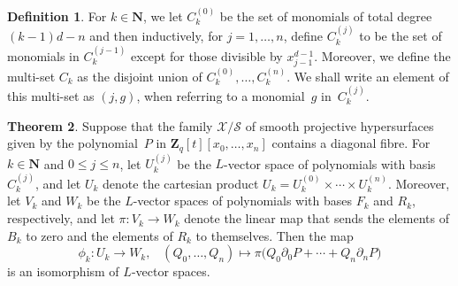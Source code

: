 \documentclass[a4paper,11pt]{article}
\numberwithin{equation}{section}
\newcommand{\NN}{\mathbf{N}} %
\newcommand{\ZZ}{\mathbf{Z}} %
\renewcommand{\to}{\rightarrow}        %
\theoremstyle{definition}
\newtheorem{thm}{Theorem}[section]
\newtheorem{defn}[thm]{Definition}
\begin{document}
\begin{defn} \label{defn:IndexSets}
For $k \in \NN$, we let $C_k^{(0)}$ be the set of monomials of total 
degree \\ 
$(k-1)d - n$ and then inductively, for $j = 1, \dotsc, n$, define 
$C_k^{(j)}$ to be the set of monomials in $C_k^{(j-1)}$ except for those 
divisible by $x_{j-1}^{d-1}$.  Moreover, we define the multi-set $C_k$ as 
the disjoint union of $C_k^{(0)}, \dotsc, C_k^{(n)}$.  We shall write an 
element of this multi-set as $(j, g)$, when referring to a monomial~$g$ 
in~$C_k^{(j)}$.
\end{defn}

\begin{thm} \label{thm:Isomorphism}
Suppose that the family $\mathcal{X}/\mathcal{S}$ of smooth projective
hypersurfaces given by the polynomial~$P$ in $\ZZ_q[t][x_0, \dotsc, x_n]$ contains 
a diagonal fibre.  For $k \in \NN$ and $0 \leq j \leq n$, let $U_k^{(j)}$ be 
the $L$-vector space of polynomials with basis $C_k^{(j)}$, and let $U_k$ 
denote the cartesian product $U_k = U_k^{(0)} \times \dotsb \times U_k^{(n)}$. 
Moreover, let $V_k$ and $W_k$ be the $L$-vector spaces of polynomials with 
bases $F_k$ and $R_k$, respectively, and let $\pi \colon V_k \rightarrow W_k$ 
denote the linear map that sends the elements of $B_k$ to zero and the 
elements of $R_k$ to themselves. %
Then the map 
\begin{equation}
\phi_k \colon U_k \to W_k, \;\;\;
(Q_0, \dotsc, Q_n) \mapsto \pi \bigl( Q_0 \partial_0 P + \dotsb + Q_n \partial_n P \bigr)
\end{equation}
is an isomorphism of $L$-vector spaces.
\end{thm}
\end{document}
